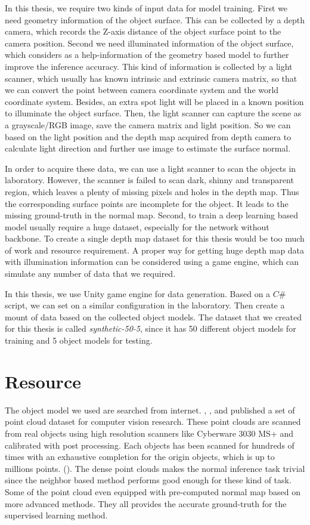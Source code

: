 \documentclass[border=15pt, multi, tikz]{article}
\begin{document}
 In this thesis, we require two kinds of input data for model training. 
 First we need geometry information of the object surface. This can be collected by a depth camera, which records the Z-axis distance of the object surface point to the camera position. 
 Second we need illuminated information of the object surface, which considers as a help-information of the geometry based model to further improve the inference accuracy. This kind of information is collected by a light scanner, which usually has known intrinsic and extrinsic camera matrix, so that we can convert the point between camera coordinate system and the world coordinate system. Besides, an extra spot light will be placed in a known position to illuminate the object surface. Then, the light scanner can capture the scene as a grayscale/RGB image, save the camera matrix and light position. So we can based on the light position and the depth map acquired from depth camera to calculate light direction and further use image to estimate the surface normal.
 
 In order to acquire these data, we can use a light scanner to scan the objects in laboratory. However, the scanner is failed to scan dark, shinny and transparent region, which leaves a plenty of missing pixels and holes in the depth map. Thus the corresponding surface points are incomplete for the object. It leads to the missing ground-truth in the normal map. Second, to train a deep learning based model usually require a huge dataset, especially for the network without backbone. To create a single depth map dataset for this thesis would be too much of work and resource requirement. A proper way for getting huge depth map data with illumination information can be considered using a game engine, which can simulate any number of data that we required.
 
 In this thesis, we use Unity game engine for data generation. Based on a $ C\# $ script, we can set on a similar configuration in the laboratory. Then create a mount of data based on the collected object models. The dataset that we created for this thesis is called \textit{synthetic-50-5}, since it has 50 different object models for training and 5 object models for testing.



\section{Resource}
The object model we used are searched from internet.
\cite{data1}, \cite{data2}, \cite{data3} and \cite{data4} published a set of point cloud dataset for computer vision research. These point clouds are scanned from real objects using high resolution scanners like Cyberware 3030 MS+ and calibrated with post processing. Each objects has been scanned for hundreds of times with an exhaustive completion for the origin objects, which is up to millions points. (\cite{data1}). The dense point clouds makes the normal inference task trivial since the neighbor based method performs good enough for these kind of task. Some of the point cloud even equipped with pre-computed normal map based on more advanced methods. They all provides the accurate ground-truth for the supervised learning method.
\end{document}
